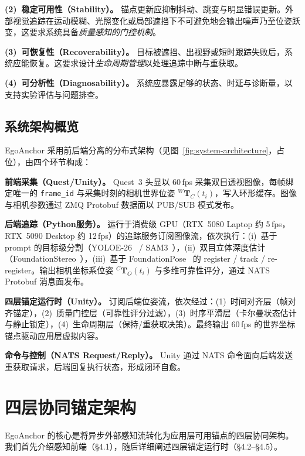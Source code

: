 \documentclass[review]{vgtc}
\begin{document}
\noindent\textbf{(2)~稳定可用性（Stability）。} 锚点更新应抑制抖动、跳变与明显错误更新。外部视觉追踪在运动模糊、光照变化或局部遮挡下不可避免地会输出噪声乃至位姿跃变，这要求系统具备\emph{质量感知的门控机制}。

\noindent\textbf{(3)~可恢复性（Recoverability）。} 目标被遮挡、出视野或短时跟踪失败后，系统应能恢复。这要求设计\emph{生命周期管理}以处理追踪中断与重获取。

\noindent\textbf{(4)~可分析性（Diagnosability）。} 系统应暴露足够的状态、时延与诊断量，以支持实验评估与问题排查。

\subsection{系统架构概览}

EgoAnchor 采用前后端分离的分布式架构（见图~\ref{fig:system-architecture}，占位），由四个环节构成：

\noindent\textbf{前端采集（Quest/Unity）。} Quest~3 头显以 60\,fps 采集双目透视图像，每帧绑定唯一的 \texttt{frame\_id} 与采集时刻的相机世界位姿 ${}^{W}\mathbf{T}_{C}(t_i)$，写入环形缓存。图像与相机参数通过 ZMQ Protobuf 数据面以 PUB/SUB 模式发布。

\noindent\textbf{后端追踪（Python服务）。} 运行于消费级 GPU（RTX~5080 Laptop 约 5\,fps，RTX~5090 Desktop 约 12\,fps）的追踪服务订阅图像流，依次执行：(i)~基于 prompt 的目标级分割（YOLOE-26~\cite{yoloe2025} / SAM3~\cite{sam3_2025}），(ii)~双目立体深度估计（FoundationStereo~\cite{foundationstereo2025}），(iii)~基于 FoundationPose~\cite{foundationpose2023} 的 register / track / re-register。输出相机坐标系位姿 ${}^{C}\mathbf{T}_{O}(t_i)$ 与多维可靠性评分，通过 NATS Protobuf 消息面发布。

\noindent\textbf{四层锚定运行时（Unity）。} 订阅后端位姿流，依次经过：(1)~时间对齐层（帧对齐锚定），(2)~质量门控层（可靠性评分过滤），(3)~时序平滑层（卡尔曼状态估计与静止锁定），(4)~生命周期层（保持/重获取决策）。最终输出 60\,fps 的世界坐标锚点驱动应用层虚拟内容。

\noindent\textbf{命令与控制（NATS Request/Reply）。} Unity 通过 NATS 命令面向后端发送重获取请求，后端回复执行状态，形成闭环自愈。

\section{四层协同锚定架构}

EgoAnchor 的核心是将异步外部感知流转化为应用层可用锚点的四层协同架构。我们首先介绍感知前端（§4.1），随后详细阐述四层锚定运行时（§4.2--§4.5）。
\end{document}
